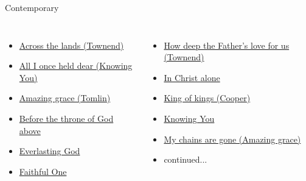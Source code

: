 \documentclass{beamer}
\begin{document}
\begin{frame}[t]{Contemporary}
\begin{columns}[t]
        \begin{itemize}
    \item \hyperlink{Across the lands["You're the Word of God the Father"](Townend)}{Across the lands (Townend)} \phantom{ 1 1 1 1 1}
    \item \hyperlink{Knowing You['All I once held dear']}{All I once held dear (Knowing You)} \phantom{ 1}
    \item \hyperlink{Amazing grace['My chains are gone'](Tomlin)}{Amazing grace (Tomlin)} \phantom{ 1 1 1 1 1 1 1}
    \item \hyperlink{Before the throne of God above[]}{Before the throne of God above } \phantom{ 1 1}
    \item \hyperlink{Everlasting God['Strength will rise']}{Everlasting God } \phantom{ 1 1 1 1 1 1 1 1 1 1}
                            \item \hyperlink{Faithful One[]}{Faithful One } \phantom{ 1 1 1 1 1 1 1 1 1 1 1}
\end{itemize}
        \begin{itemize}
                                            \item \hyperlink{How deep the Father's love for us[](Townend)}{How deep the Father's love for us (Townend)} \phantom{}
            \item \hyperlink{In Christ alone[]}{In Christ alone } \phantom{ 1 1 1 1 1 1 1 1 1 1}
    \item \hyperlink{King of kings[](Cooper)}{King of kings (Cooper)} \phantom{ 1 1 1 1 1 1 1}
    \item \hyperlink{Knowing You['All I once held dear']}{Knowing You } \phantom{ 1 1 1 1 1 1 1 1 1 1 1 1}
                            \item \hyperlink{Amazing grace['My chains are gone'](Tomlin)}{My chains are gone (Amazing grace)} \phantom{ 1}
    \item[] continued...
            \end{itemize}
            \end{columns}
            \end{frame}
\end{document}
